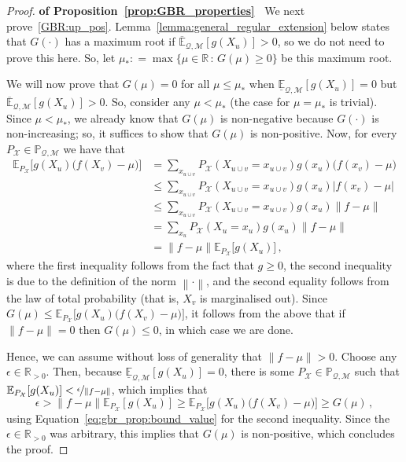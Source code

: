 \documentclass[twoside,11pt]{article}
\newcommand{\reals}{\mathbb{R}}
\newcommand{\realspos}{\reals_{>0}}
\newcommand{\states}{\mathcal{X}}
\newcommand{\lexp}{\underline{\mathbb{E}}_{\rateset,\mathcal{M}}}
\newcommand{\uexp}{\overline{\mathbb{E}}_{\rateset,\mathcal{M}}}
\newcommand{\rateset}{\mathcal{Q}}
\newcommand{\norm}[1]{\left\lVert #1 \right\rVert}
\newcommand{\abs}[1]{\left\vert #1 \right\vert}
\newcommand{\coloneqq}{:\!=}
\begin{document}
\begin{proof}{\bf of Proposition~\ref{prop:GBR_properties}~}
We next prove~\ref{GBR:up_pos}. Lemma~\ref{lemma:general_regular_extension} below states that $G(\cdot)$ has a maximum root if $\uexp[g(X_u)]>0$, so we do not need to prove this here. So, let $\mu_*\coloneqq \max\{\mu\in\reals\,:\,G(\mu)\geq 0\}$ be this maximum root.

We will now prove that $G(\mu)=0$ for all $\mu\leq\mu_*$ when $\lexp[g(X_u)]=0$ but $\uexp[g(X_u)]>0$. So, consider any $\mu<\mu_*$ (the case for $\mu=\mu_*$ is trivial). Since $\mu<\mu_*$, we already know that $G(\mu)$ is non-negative because $G(\cdot)$ is non-increasing; so, it suffices to show that $G(\mu)$ is non-positive. Now, for every $P_\states\in\mathbb{P}_{\rateset,\mathcal{M}}$ we have that
\begin{equation}\label{eq:gbr_prop:bound_value}
\begin{split}
\mathbb{E}_{P_\states}\bigl[g(X_u)\bigl(f(X_v) - \mu\bigr)\bigr] &= \sum_{x_{u\cup v}} P_\states(X_{u\cup v}=x_{u\cup v})g(x_u)\bigl(f(x_v)-\mu\bigr) \\
 &\leq \sum_{x_{u\cup v}} P_\states(X_{u\cup v}=x_{u\cup v})g(x_u)\abs{f(x_v)-\mu} \\
 &\leq \sum_{x_{u\cup v}} P_\states(X_{u\cup v}=x_{u\cup v})g(x_u)\norm{f-\mu} \\
 &= \sum_{x_{u}} P_\states(X_{u}=x_{u})g(x_u)\norm{f-\mu} \\
 &= \norm{f-\mu}\mathbb{E}_{P_\states}\bigl[g(X_u)\bigr]\,,
\end{split}
\end{equation}
where the first inequality follows from the fact that $g\geq 0$, the second inequality is due to the definition of the norm $\norm{\cdot}$, and the second equality follows from the law of total probability (that is, $X_v$ is marginalised out). Since $G(\mu)\leq \mathbb{E}_{P_\states}\bigl[g(X_u)\bigl(f(X_v) - \mu\bigr)\bigr]$, it follows from the above that if $\norm{f-\mu}=0$ then $G(\mu)\leq 0$, in which case we are done. 

Hence, we can assume without loss of generality that $\norm{f-\mu}>0$. Choose any $\epsilon\in\realspos$. Then, because $\lexp[g(X_u)]=0$, there is some $P_\states\in\mathbb{P}_{\rateset,\mathcal{M}}$ such that $\mathbb{E}_{P_\states}[g(X_u)] < \nicefrac{\epsilon}{\norm{f-\mu}}$, which implies that
\begin{equation*}
\epsilon > \norm{f-\mu}\mathbb{E}_{P_\states}[g(X_u)] \geq \mathbb{E}_{P_\states}\bigl[g(X_u)\bigl(f(X_v) - \mu\bigr)\bigr] \geq G(\mu)\,,
\end{equation*}
using Equation~\eqref{eq:gbr_prop:bound_value} for the second inequality. Since the $\epsilon\in\realspos$ was arbitrary, this implies that $G(\mu)$ is non-positive, which concludes the proof.


\end{proof}
\end{document}
